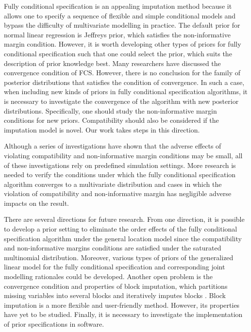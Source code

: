 	Fully conditional specification is an appealing imputation method because it allows one to specify a sequence of flexible and simple conditional models and bypass the difficulty of multivariate modelling in practice. The default prior for normal linear regression is Jeffreys prior, which satisfies the non-informative margin condition. However, it is worth developing other types of priors for fully conditional specification such that one could select the prior, which suits the description of prior knowledge best. Many researchers have discussed the convergence condition of FCS. However, there is no conclusion for the family of posterior distributions that satisfies the condition of convergence. In such a case, when including new kinds of priors in fully conditional specification algorithms, it is necessary to investigate the convergence of the algorithm with new posterior distributions. Specifically, one should study the non-informative margin conditions for new priors. Compatibility should also be considered if the imputation model is novel. Our work takes steps in this direction. 
	
	Although a series of investigations have shown that the adverse effects of violating compatibility and non-informative margin conditions may be small, all of these investigations rely on predefined simulation settings. More research is needed to verify the conditions under which the fully conditional specification algorithm converges to a multivariate distribution and cases in which the violation of compatibility and non-informative margin has negligible adverse impacts on the result.
	
	
	There are several directions for future research. From one direction, it is possible to develop a prior setting to eliminate the order effects of the fully conditional specification algorithm under the general location model since the compatibility and non-informative margins conditions are satisfied under the saturated multinomial distribution. Moreover, various types of priors of the generalized linear model for the fully conditional specification and corresponding joint modelling rationales could be developed. Another open problem is the convergence condition and properties of block imputation, which partitions missing variables into several blocks and iteratively imputes blocks \citep[Section 4.7.2]{Buuren2018}. Block imputation is a more flexible and user-friendly method. However, its properties have yet to be studied. Finally, it is necessary to investigate the implementation of prior specifications in software.         
	
	
